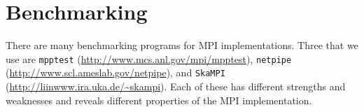 \documentclass[dvipdfm,11pt]{article}
\begin{document}







\section{Benchmarking}
\label{sec:benchmarking}

There are many benchmarking programs for MPI implementations.  Three that we
use are \texttt{mpptest} (\url{http://www.mcs.anl.gov/mpi/mpptest}),
\texttt{netpipe} (\url{http://www.scl.ameslab.gov/netpipe}), and
\texttt{SkaMPI} (\url{http://liinwww.ira.uka.de/~skampi}).  Each of these has
different strengths and weaknesses and reveals different properties of the MPI
implementation.  
\end{document}
